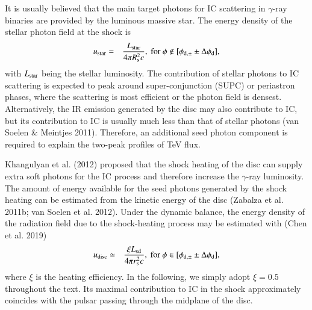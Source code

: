 \documentclass{aa}
\begin{document}
It is usually believed that the main target photons for IC scattering in $\gamma$-ray binaries are provided by the luminous massive star. The energy density of the stellar photon field at the shock is
\begin{eqnarray}\label{ustar}
  u_{\rm star}&=&\frac{L_{\rm star}}{4\pi R_{\rm s}^2c},\ \rm{for}\ \phi\notin[\phi_{\rm d, \pm}\pm\Delta\phi_{\rm d}],
\end{eqnarray}
with $L_{\rm star}$ being the stellar luminosity. The contribution of stellar photons to IC scattering is expected to peak around super-conjunction (SUPC) or periastron phases, where the scattering is most efficient or the photon field is densest.
Alternatively, the IR emission generated by the disc may also contribute to IC, but its contribution to IC is usually much less than that of stellar photons (van Soelen \& Meintjes 2011). Therefore, an additional seed photon component is required to explain the two-peak profiles of TeV flux.

Khangulyan et al. (2012) proposed that the shock heating of the disc can supply extra soft photons for the IC process and therefore increase the $\gamma$-ray luminosity. The amount of energy available for the seed photons generated by the shock heating can be estimated from the kinetic energy of the  disc (Zabalza et al. 2011b; van Soelen et al. 2012). Under the dynamic balance, the energy density of the radiation field due to the shock-heating process may be estimated with (Chen et al. 2019)
\begin{eqnarray}\label{udisc}
  u_{\rm disc}&\simeq&\frac{\xi L_{\rm sd}}{4\pi r_{\rm s}^2c},\ \rm{for}\ \phi\in[\phi_{\rm d, \pm}\pm\Delta\phi_{\rm d}],
\end{eqnarray}
where $\xi$ is the heating efficiency. In the following, we simply adopt $\xi=0.5$ throughout the text. Its maximal contribution to IC in the shock approximately coincides with the pulsar passing through the midplane of the disc.

\end{document}

